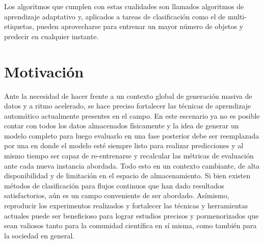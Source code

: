Los algoritmos que cumplen con estas cualidades son llamados algoritmos de
aprendizaje adaptativo y, aplicados a tareas de clasificación como el de
multi-etiquetas, pueden aprovecharse para entrenar un mayor número de objetos y
predecir en cualquier instante. 


\section{Motivación} 

Ante la necesidad de hacer frente a un contexto global de generación masiva de
datos y a ritmo acelerado, se hace preciso fortalecer las técnicas de
aprendizaje automático actualmente presentes en el campo. En este escenario ya
no es posible contar con todos los datos almacenados físicamente y la idea de
generar un modelo completo para luego evaluarlo en una fase posterior debe ser
reemplazada por una en donde el modelo esté siempre listo para realizar
predicciones y al mismo tiempo ser capaz de re-entrenarse y recalcular las
métricas de evaluación ante cada nueva instancia abordada. Todo esto en un
contexto cambiante, de alta disponibilidad y de limitación en el espacio de
almacenamiento. Si bien existen métodos de clasificación para flujos continuos
que han dado resultados satisfactorios, aún es un campo conveniente de ser
abordado. Asímismo, reproducir los experimentos realizados y fortalecer las
técnicas y herramientas actuales puede ser beneficioso para lograr estudios
precisos y pormenorizados que sean valiosos tanto para la comunidad científica
en sí misma, como también para la sociedad en general.

